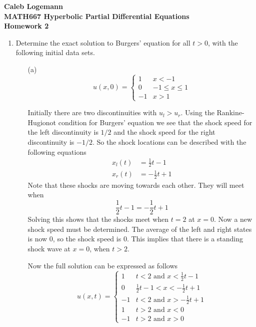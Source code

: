 \documentclass[11pt, oneside]{article}
\begin{document}
\noindent \textbf{\Large{Caleb Logemann \\
MATH667 Hyperbolic Partial Differential Equations \\
Homework 2
}}

%
\begin{enumerate}
  \item %
    Determine the exact solution to Burgers' equation for all $t > 0$, with the
    following initial data sets.
    \begin{enumerate}
      \item[(a)] %
        \[
          u(x,0) =
          \begin{cases}
            1 & x < -1 \\
            0 & -1 \le x \le 1 \\
            -1 & x > 1
          \end{cases}
        \]

        Initially there are two discontinuities with $u_l > u_r$.
        Using the Rankine-Hugionot condition for Burgers' equation we see that the
        shock speed for the left discontinuity is $1/2$ and the shock speed
        for the right discontinuity is $-1/2$.
        So the shock locations can be described with the following equations
        \begin{align*}
          x_l(t) &= \frac{1}{2}t - 1 \\
          x_r(t) &= -\frac{1}{2}t + 1
        \end{align*}
        Note that these shocks are moving towards each other.
        They will meet when
        \[
          \frac{1}{2}t - 1 = -\frac{1}{2}t + 1
        \]
        Solving this shows that the shocks meet when $t = 2$ at $x = 0$.
        Now a new shock speed must be determined.
        The average of the left and right states is now $0$, so the shock speed
        is $0$.
        This implies that there is a standing shock wave at $x = 0$, when
        $t > 2$.

        Now the full solution can be expressed as follows
        \[
          u(x, t) =
          \begin{cases}
             1 & t < 2 \text{ and } x < \frac{1}{2}t - 1 \\
             0 & \frac{1}{2}t - 1 < x < -\frac{1}{2}t + 1 \\
            -1 & t < 2 \text{ and } x > -\frac{1}{2}t + 1 \\
             1 & t > 2 \text{ and } x < 0 \\
            -1 & t > 2 \text{ and } x > 0
          \end{cases}
        \]


\end{enumerate}
\end{enumerate}
\end{document}

